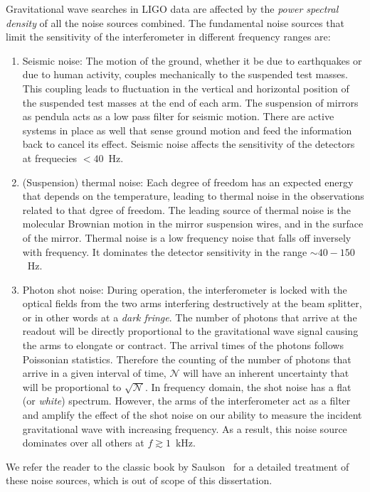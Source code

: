 Gravitational wave searches in LIGO data are affected by the {\it power
spectral density} of all the noise sources combined. The fundamental noise 
sources that limit the sensitivity of the interferometer in different frequency
ranges are:
% 
\begin{enumerate}
 \item Seismic noise:
 The motion of the ground, whether it be due to earthquakes or due to human 
 activity, couples mechanically to the suspended test masses. This coupling
 leads to fluctuation in the vertical and horizontal position of the suspended
 test masses at the end of each arm. The suspension of mirrors as pendula acts 
 as a low pass filter for seismic motion. There are active systems in place as
 well that sense ground motion and feed the information back to cancel its
 effect. Seismic noise affects the sensitivity of the detectors at frequecies
 $< 40$~Hz.
 \item (Suspension) thermal noise:
 Each degree of freedom has an expected energy that depends on the temperature,
 leading to thermal noise in the observations related to that dgree of freedom.
 The leading source of thermal noise is the molecular Brownian motion in the
 mirror suspension wires, and in the surface of the mirror. Thermal noise is 
 a low frequency noise that falls off inversely with frequency. It dominates
 the detector sensitivity in the range $\sim 40-150$~Hz.
 \item Photon shot noise:
 During operation, the interferometer is locked 
 with the optical fields from the two arms interfering destructively at the
 beam splitter, or in other words at a {\it dark fringe}. The number of photons
 that arrive at the readout will be directly proportional to the gravitational
 wave signal causing the arms to elongate or contract. The arrival times of the
 photons follows Poissonian statistics. Therefore the counting of the number of
 photons that arrive in a given interval of time, $\mathcal{N}$ will have an 
 inherent uncertainty that will be proportional to $\sqrt{\mathcal{N}}$.
 In frequency domain, the shot noise has a flat (or {\it white}) spectrum. 
 However, the arms of the interferometer act as a filter and amplify the effect
 of the shot noise on our ability to measure the incident gravitational wave
 with increasing frequency. As a result, this noise source dominates over all
 others at $f\gtrsim 1$~kHz.
\end{enumerate}
% 
We refer the reader to the classic book by Saulson~\cite{Saulson:1995zi} for a
detailed treatment of these noise sources, which is out of scope of this 
dissertation. 

